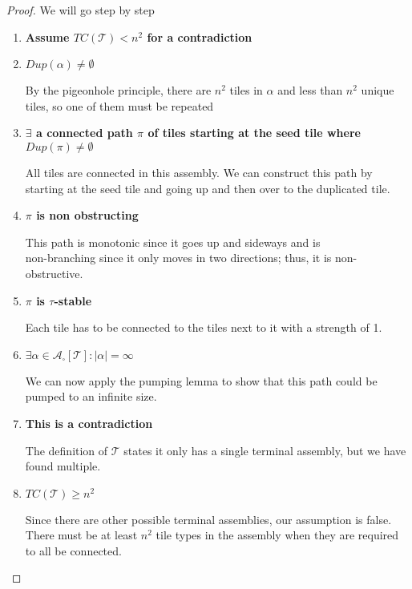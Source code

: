\documentclass[12pt]{article}
\begin{document}
\begin{proof}
	We will go step by step
	\begin{enumerate}
		\item \textbf{Assume $TC(\mathcal{T}) < n^2$ for a contradiction}

		\item \textbf{$Dup(\alpha) \neq \emptyset$}

		By the pigeonhole principle, there are $n^2$ tiles in $\alpha$ and less than $n^2$ unique tiles, so one of them must be repeated

		\item \textbf{$\exists$ a connected path $\pi$ of tiles starting at the seed tile where $Dup(\pi) \neq \emptyset$}

		All tiles are connected in this assembly. We can construct this path by starting at the seed tile and going up and then over to the duplicated tile. 

		\item \textbf{$\pi$ is non obstructing}
        
            This path is monotonic since it goes up and side\-ways and is \\ non-branching since it only moves in two directions; thus, it is non-obstructive. 
        \item \textbf{$\pi$ is $\tau$-stable}

            Each tile has to be connected to the tiles next to it with a strength of 1.

        \item \textbf{$\exists \alpha \in \mathcal{A}_\square[\mathcal{T}] : |\alpha| = \infty $}

        We can now apply the pumping lemma to show that this path could be pumped to an infinite size.

        \item \textbf{This is a contradiction}

        The definition of $\mathcal{T}$ states it only has a single terminal assembly, but we have found multiple.

		\item \textbf{$TC(\mathcal{T}) \geq n^2$}

            Since there are other possible terminal assemblies, our assumption is false. There must be at least $n^2$ tile types in the assembly when they are required to all be connected. 


	\end{enumerate}
\end{proof}
\end{document}
